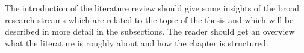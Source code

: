 The introduction of the literature review should give some insights of the broad research streams which are related to the topic of the thesis and which will be described in more detail in the subsections. The reader should get an overview what the literature is roughly about and how the chapter is structured.

